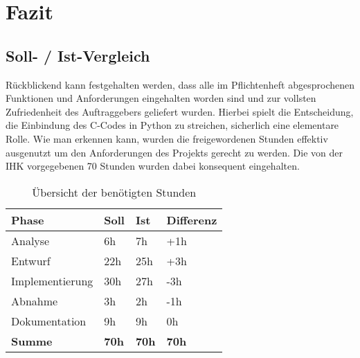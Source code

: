 \section{Fazit}
\label{section:postmortem}
\subsection{Soll- / Ist-Vergleich}
Rückblickend kann festgehalten werden, dass alle im Pflichtenheft
abgesprochenen Funktionen und Anforderungen eingehalten worden sind
und zur vollsten Zufriedenheit des Auftraggebers geliefert wurden. Hierbei
spielt die Entscheidung, die Einbindung des C-Codes in Python zu streichen, sicherlich
eine elementare Rolle. Wie man erkennen kann, wurden die freigewordenen Stunden effektiv
ausgenutzt um den Anforderungen des Projekts gerecht zu werden. Die von der IHK vorgegebenen 70 Stunden wurden dabei konsequent eingehalten.


\begin{table}[!htp]
    \centering
    \caption{Übersicht der benötigten Stunden}
    \label{tabelle:sollist}
    \begin{tabular}{llll}
        \hline
        \rowcolor[HTML]{9698ED}
        {\color[HTML]{FFFFFF} \textbf{Phase}} & {\color[HTML]{FFFFFF} \textbf{Soll}} & {\color[HTML]{FFFFFF} \textbf{Ist}} & {\color[HTML]{FFFFFF} \textbf{Differenz}} \\ \hline
        Analyse                               & 6h                                   & 7h                                  & +1h                                       \\
        \rowcolor[HTML]{BBDAFF}
        Entwurf                               & 22h                                  & 25h                                 & +3h                                       \\
        Implementierung                       & 30h                                  & 27h                                 & -3h                                       \\
        \rowcolor[HTML]{BBDAFF}
        Abnahme                               & 3h                                   & 2h                                  & -1h                                       \\
        Dokumentation                         & 9h                                   & 9h                                  & 0h                                        \\ \hline
        \rowcolor[HTML]{9698ED}
        {\color[HTML]{FFFFFF} \textbf{Summe}} & {\color[HTML]{FFFFFF} \textbf{70h}}  & {\color[HTML]{FFFFFF} \textbf{70h}} & {\color[HTML]{FFFFFF} \textbf{70h}}       \\ \hline
    \end{tabular}
\end{table}

